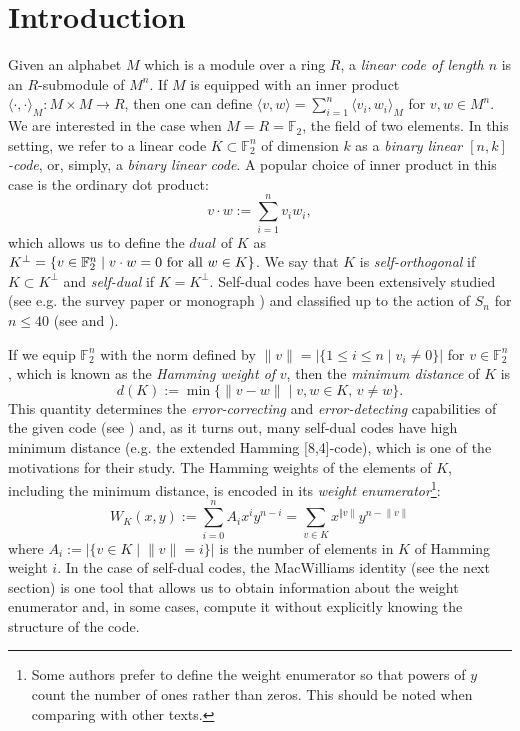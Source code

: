 \documentclass[a4paper,reqno]{amsart}
\newcommand{\bydef}{:=}
\newcommand{\FF}{\mathbb{F}}
\theoremstyle{definition}
\theoremstyle{remark} \newtheorem{remark}[theorem]{Remark}
\numberwithin{equation}{section}
\begin{document}

\section{Introduction}\label{sec:intro}

Given an alphabet $M$ which is a module over a ring $R$, a \emph{linear code of length \(n\)} is an \(R\)-submodule of \(M^n\). If \(M\) is equipped with an inner product \(\langle \cdot, \cdot \rangle_M : M \times M \to R\), then one can define \(\langle v, w \rangle = \sum_{i=1}^n \langle v_i, w_i \rangle_M\) for \(v, w \in M^n\). We are interested in the case when \(M = R = \mathbb{F}_2\), the field of two elements. In this setting, we refer to a linear code \(K \subset \mathbb{F}_2^n\) of dimension \(k\) as a \emph{binary linear \([n,k]\)-code}, or, simply, a \emph{binary linear code}. A popular choice of inner product in this case is the ordinary dot product:
\begin{equation*}
    v \cdot w \bydef \sum_{i=1}^n v_iw_i,
\end{equation*}
which allows us to define the \(dual\) of \(K\) as \(K^\perp = \{v \in \mathbb{F}_2^n \mid v \cdot w = 0 \textnormal{ for all } w \in K\}\). We say that \(K\) is \emph{self-orthogonal} if \(K \subset K^\perp\) and \emph{self-dual} if \(K = K^\perp\). Self-dual codes have been extensively studied (see e.g. the survey paper \cite{RS} or monograph \cite{NRS}) and classified up to the action of \(S_n\) for \(n \leq 40\) (see \cite{Bouy12} and \cite{Bouy15}). 

If we equip \(\mathbb{F}_2^n\) with the norm defined by \(\lVert v \rVert = \lvert \{1 \leq i \leq n \mid v_i \neq 0\} \rvert\) for $v\in\FF_2^n$, which is known as the \emph{Hamming weight of} \(v\), then the \emph{minimum distance} of \(K\) is 
\begin{equation*}
    d(K) \bydef \min \{\lVert v - w \rVert \mid v,w \in K,\, v \neq w\}.
\end{equation*}
This quantity determines the \emph{error-correcting} and \emph{error-detecting} capabilities of the given code (see \cite[p.~49]{Adam}) and, as it turns out, many self-dual codes have high minimum distance (e.g. the extended Hamming [8,4]-code), which is one of the motivations for their study. The Hamming weights of the elements of $K$, including the minimum distance, is encoded in its \emph{weight enumerator}\footnote{Some authors prefer to define the weight enumerator so that powers of \(y\) count the number of ones rather than zeros. This should be noted when comparing with other texts.}:
\begin{equation*}
    W_K(x,y) \bydef \sum_{i=0}^n A_i x^iy^{n-i} = \sum_{v \in K}x^{\Vert v \rVert}y^{n - \lVert v \rVert}
\end{equation*}
where \(A_i \bydef \lvert \{v \in K \mid \lVert v \rVert = i\} \rvert\) is the number of elements in \(K\) of Hamming weight \(i\). In the case of self-dual codes, the MacWilliams identity (see the next section) is one tool that allows us to obtain information about the weight enumerator and, in some cases, compute it without explicitly knowing the structure of the code. 
\end{document}
